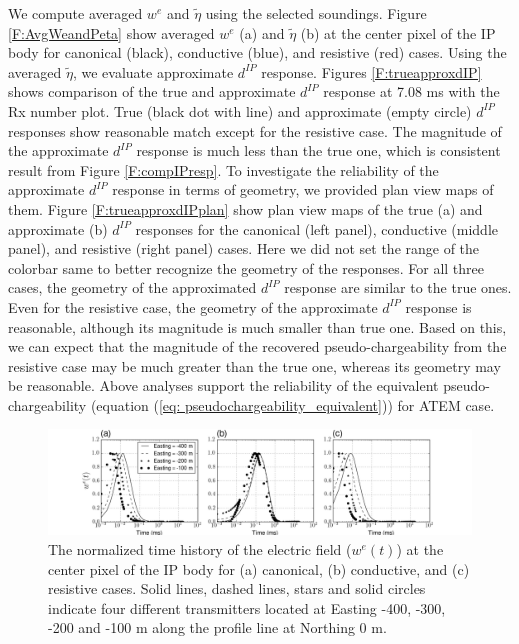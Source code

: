 \documentclass[a4paper, 11pt]{article}
\newcommand{\peta}{\tilde{\eta}}
\newcommand{\dip}{d^{IP}}
\begin{document}
We compute averaged $w^e$ and $\peta$ using the selected soundings. Figure \ref{F:AvgWeandPeta} show averaged $w^e$ (a) and $\peta$ (b) at the center pixel of the IP body for canonical (black), conductive (blue), and resistive (red) cases.
Using the averaged $\peta$, we evaluate approximate $\dip$ response. Figures \ref{F:trueapproxdIP} shows comparison of the true and approximate $\dip$ response at 7.08 ms with the Rx number plot. True (black dot with line) and approximate (empty circle) $\dip$ responses show reasonable match except for the resistive case. The magnitude of the approximate $\dip$ response is much less than the true one, which is consistent result from Figure \ref{F:compIPresp}. To investigate the reliability of the approximate $\dip$ response in terms of geometry, we provided plan view maps of them. Figure \ref{F:trueapproxdIPplan} show plan view maps of the true (a) and  approximate (b) $\dip$ responses for the canonical (left panel), conductive (middle panel), and resistive (right panel) cases. Here we did not set the range of the colorbar same to better recognize the geometry of the responses. For all three cases, the geometry of the approximated $\dip$ response are similar to the true ones. Even for the resistive case, the geometry of the approximate $\dip$ response is reasonable, although its magnitude is much smaller than true one. Based on this, we can expect that the magnitude of the recovered pseudo-chargeability from the resistive case may be much greater than the true one, whereas its geometry may be reasonable. Above analyses support the reliability of the equivalent pseudo-chargeability (equation (\ref{eq: pseudochargeability_equivalent})) for ATEM case. 

\begin{figure}[htb]
  \centering  \includegraphics[width=1.0\textwidth]{figures/threecasesavg/we_multiTx.png}
  \caption{The normalized time history of the electric field ($w^e(t)$) at the center pixel of the IP body for (a) canonical, (b) conductive, and (c) resistive cases. Solid lines, dashed lines, stars and solid circles indicate four different transmitters located at Easting -400, -300, -200 and -100 m  along the profile line at Northing 0 m. }
  \label{F:we_multiTx}
\end{figure}
\end{document}
